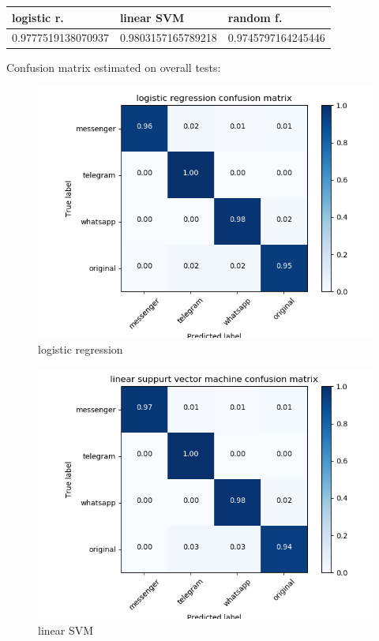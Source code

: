  {\def\arraystretch{1.3} 
 \begin{table}[H] 
\centering 
\begin{tabular}{|l|l|l|} 
\hline 
logistic r.  &linear SVM  &random f.  \\ \hline
0.9777519138070937  &0.9803157165789218  &0.9745797164245446  \\ \hline
\end{tabular} 
\end{table} }
Confusion matrix estimated on overall tests: 

 \begin{figure}[H] 
\centering 
\includegraphics[scale=.6]{images/logistic_total.png} 
\caption{logistic regression} 
\end{figure} 

 \begin{figure}[H] 
\centering 
\includegraphics[scale=.6]{images/lsvm_total.png} 
\caption{linear SVM} 
\end{figure} 

